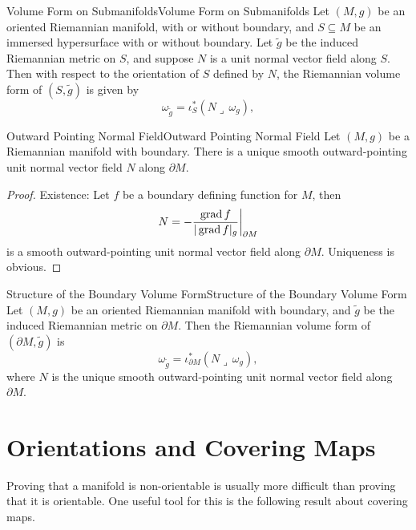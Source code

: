 \documentclass[../main.tex]{subfiles}
\begin{document}
\begin{proposition}{Volume Form on Submanifolds}{Volume Form on Submanifolds}
  Let $(M,g)$ be an oriented Riemannian manifold, with or without boundary, and $S \subseteq M$ be an immersed hypersurface with or without boundary. Let $\tilde{g}$ be the induced Riemannian metric on $S$, and suppose $N$ is a unit normal vector field along $S$. Then with respect to the orientation of $S$ defined by $N$, the Riemannian volume form of $(S, \tilde{g})$ is given by
  \begin{equation}
    \omega_{\tilde{g}} = \iota_S^* (N \lrcorner \, \omega_g),
  \end{equation}
\end{proposition}

\begin{proposition}{Outward Pointing Normal Field}{Outward Pointing Normal Field}
  Let $(M,g)$ be a Riemannian manifold with boundary. There is a unique smooth outward-pointing unit normal vector field $N$ along $\partial M$.
\end{proposition}
\begin{proof}
  Existence: Let $f$ be a boundary defining function for $M$, then
  \begin{equation*}
    N = -\frac{\operatorname{grad} f}{|\operatorname{grad} f|_g} \bigg|_{\partial M}
  \end{equation*}
  is a smooth outward-pointing unit normal vector field along $\partial M$. Uniqueness is obvious.
\end{proof}

\begin{corollary}{Structure of the Boundary Volume Form}{Structure of the Boundary Volume Form}
  Let $(M,g)$ be an oriented Riemannian manifold with boundary, and $\tilde{g}$ be the induced Riemannian metric on $\partial M$. Then the Riemannian volume form of $(\partial M, \tilde{g})$ is
  \begin{equation*}
    \omega_{\tilde{g}} = \iota_{\partial M}^* (N \lrcorner \, \omega_g),
  \end{equation*}
  where $N$ is the unique smooth outward-pointing unit normal vector field along $\partial M$.
\end{corollary}

\section{Orientations and Covering Maps}
Proving that a manifold is non-orientable is usually more difficult than proving that it is orientable. One useful tool for this is the following result about covering maps.
\end{document}
